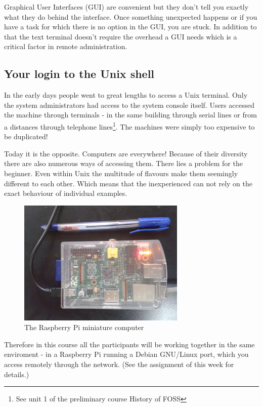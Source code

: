 \documentclass[11pt,a4paper,twoside]{article}
\begin{document}
Graphical User Interfaces (GUI) are convenient but they don't tell you 
exactly what they do behind the interface. Once something unexpected 
happens or if you have a task for which there is no option in the GUI, 
you are stuck. In addition to that the text terminal doesn't require the 
overhead a GUI needs which is a critical factor in remote administration. 


\subsection{Your login to the Unix shell}

In the early days people went to great lengths to access a Unix terminal. 
Only the system administrators had access to the system console itself.
Users accessed the machine through terminals - in the same building 
through serial lines or from a distances through telephone 
lines\footnote{See unit 1 of the preliminary course History of FOSS}. 
The machines were simply too expensive to be duplicated!

Today it is the opposite. Computers are everywhere! Because of their
diversity there are also numerous ways of accessing them. There lies a 
problem for the beginner. Even within Unix the multitude of flavours 
make them seemingly different to each other. Which means that the 
inexperienced can not rely on the exact behaviour of individual examples.

\begin{figure}[htb]
  \begin{center}
    \includegraphics[width=8cm]{images/20150126_152213_scaled}
    \caption{The Raspberry Pi miniature computer}
  \end{center}
\end{figure}

Therefore in this course all the participants will be working together in 
the same enviroment - in a Raspberry Pi running a Debian GNU/Linux port, 
which you access remotely through the network. (See the assignment of this 
week for details.)
\end{document}
